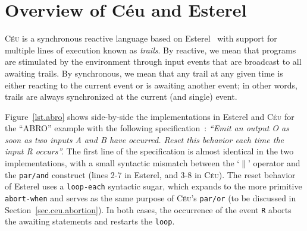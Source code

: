 \documentclass{acm_proc_article-sp}
\newcommand{\CEU}{\textsc{C\'{e}u}\xspace}
\newcommand{\code}[1] {{\small{\texttt{#1}}}}
\newcommand{\1}{\;}
\newcommand{\2}{\;\;}
\newcommand{\3}{\;\;\;}
\newcommand{\5}{\;\;\;\;\;}
\begin{document}
\begin{comment}
In this work, we present \CEU, a reactive language targeting embedded systems 
that unifies both imperative and dataflow synchronous programming styles.
\CEU is based on a small set of reactive control primitives similar in 
functionality to Esterel's \cite{esterel.design}.
On top of this kernel, \CEU provides disciplined side effects, which together 
with internal events enable dataflow capabilities to the language.

Although, the first two items are similar, they are orthogonal.
One is at compile time, the other runtime.
Even without the first, the second is still valid.
The first warns about suspicious programs that still execute deterministically.

In our discussion, shared memory concerns not only variables, but also 
low-level accesses that ultimately use shared resources in the underlying 
platform (e.g., memory-mapped ports for I/O).

The stacked execution for internal events introduces support for a restricted 
form of subroutines that cannot express recursive definitions (either directly 
or indirectly), resulting in memory-bounded programs that preclude stack 
overflows.
\end{comment}

\section{Overview of C\'eu and Esterel}
\label{sec.ceu}

\CEU is a synchronous reactive language based on Esterel~\cite{esterel.ieee91} 
with support for multiple lines of execution known as \emph{trails}.
By reactive, we mean that programs are stimulated by the environment through 
input events that are broadcast to all awaiting trails.
By synchronous, we mean that any trail at any given time is either reacting to 
the current event or is awaiting another event;
in other words, trails are always synchronized at the current (and single) 
event.

Figure~\ref{lst.abro} shows side-by-side the implementations in Esterel and 
\CEU for the ``ABRO'' example with the following 
specification~\cite{esterel.primer}:
%
\emph{``Emit an output O as soon as two inputs A and B have occurred.
Reset this behavior each time the input R occurs''.}
%
The first line of the specification is almost identical in the two 
implementations, with a small syntactic mismatch between the `$\|$' operator 
and the \code{par/and} construct (lines 2-7 in Esterel, and 3-8 in \CEU).
%
The reset behavior of Esterel uses a \code{loop-each} syntactic sugar, which 
expands to the more primitive \code{abort-when} and serves as the same purpose 
of \CEU's \code{par/or} (to be discussed in Section~\ref{sec.ceu.abortion}).
In both cases, the occurrence of the event \code{R} aborts the awaiting 
statements and restarts the \code{loop}.
\end{document}
